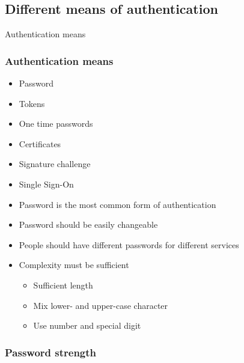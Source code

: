 \subsection{Different means of authentication}
\begin{frametransition}{Authentication means}
\end{frametransition}

\begin{frame}
\frametitle{Authentication means}
\begin{itemize}
\item Password
\pause
\item Tokens
\pause
\item One time passwords
\pause
\item Certificates
\pause
\item Signature challenge
\pause
\item Single Sign-On
\end{itemize}
\end{frame}

\begin{frame}
\begin{itemize}
\item Password is the most common form of authentication
\pause
\item Password should be easily changeable
\pause
\item People should have different passwords for different services
\pause
\item Complexity must be sufficient
\pause
\begin{itemize}
\item Sufficient length
\pause
\item Mix lower- and upper-case character
\pause
\item Use number and special digit
\end{itemize}
\end{itemize}
\end{frame}

\begin{frame}
\frametitle{Password strength}
\end{frame}


